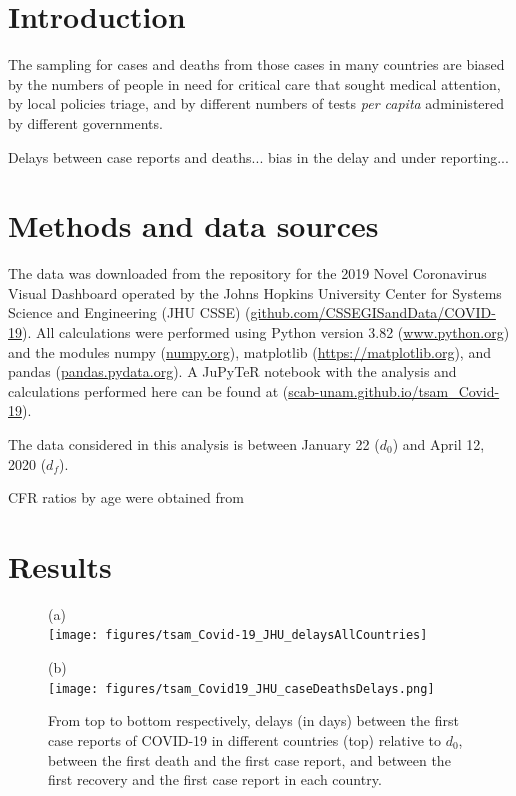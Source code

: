 \documentclass[8pt]{article}
\begin{document}
\section{Introduction}
The sampling for cases and deaths from those cases in many countries are biased by the numbers of people in need for critical care that sought medical attention, by local policies triage, and by different numbers of tests \textit{per capita} administered by different governments. 

Delays between case reports and deaths... bias in the delay and under reporting...

\section{Methods and data sources} 

The data was downloaded from the repository for the 2019 Novel Coronavirus Visual Dashboard operated by the Johns Hopkins University Center for Systems Science and Engineering (JHU CSSE)  (\url{github.com/CSSEGISandData/COVID-19}). 
All calculations were performed using Python version 3.82 (\url{www.python.org}) and the modules numpy (\url{numpy.org}), matplotlib (\url{https://matplotlib.org}), and pandas (\url{pandas.pydata.org}). 
A JuPyTeR notebook with the analysis and calculations performed here can be found at (\url{scab-unam.github.io/tsam_Covid-19}).

The data considered in this analysis is between January 22 ($d_0$) and April 12, 2020 ($d_f$).

CFR ratios by age were obtained from \citep{}


\section{Results}


\begin{figure}[h]
    \centering
    \begin{minipage}{0.5\textwidth}
    (a)\\
    \texttt{[image: figures/tsam\_Covid-19\_JHU\_delaysAllCountries]}
    \end{minipage}%
    \begin{minipage}{0.5\textwidth}
    (b)\\
    \texttt{[image: figures/tsam\_Covid19\_JHU\_caseDeathsDelays.png]}
    \end{minipage}
    \caption{From top to bottom respectively, delays (in days) between the first case reports of COVID-19 in different countries (top) relative to $d_0$, between the first death and the first case report, and  between the first recovery and the first case report 
    in each country.}
    \label{fig:caseDelays}
\end{figure}
\end{document}
